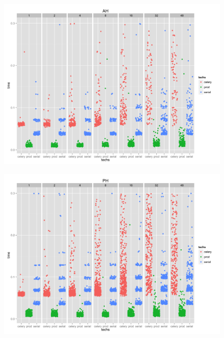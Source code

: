 \documentclass{beamer}
\begin{document}
\begin{frame}
\begin{figure}
\includegraphics[width=\linewidth]{images/AH.png}
\end{figure}
\end{frame}

\begin{frame}
\begin{figure}
\includegraphics[width=\linewidth]{images/PH.png}
\end{figure}
\end{frame}
\end{document}
